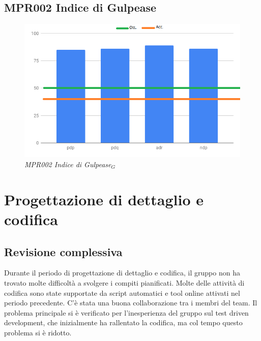 \subsection{MPR002 Indice di Gulpease}
\begin{figure} [H]
    \centering
	\includegraphics[scale=0.5]{./images/gulpeaseP.png}
    \caption{\textit{MPR002 \textit{Indice di Gulpease$_{G}$}}}
\end{figure}

\section{Progettazione di dettaglio e codifica}
\label{resocontoProg}

\subsection{Revisione complessiva}
Durante il periodo di progettazione di dettaglio e codifica, il gruppo non ha trovato molte difficoltà a svolgere i compiti pianificati. Molte delle attività di codifica sono state supportate da script automatici e tool online attivati nel periodo precedente. C'è stata una buona collaborazione tra i membri del team. Il problema principale si è verificato per l'inesperienza del gruppo sul test driven development, che inizialmente ha rallentato la codifica, ma col tempo questo problema si è ridotto. 

